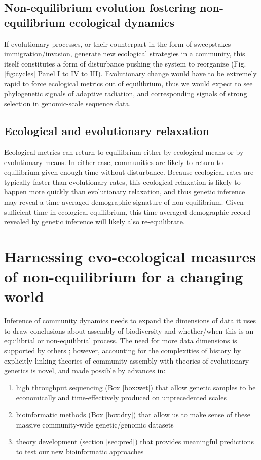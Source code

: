 \documentclass[12pt]{article}
\newcounter{Box}
\begin{document}
\subsection{Non-equilibrium evolution fostering non-equilibrium ecological dynamics}

If evolutionary processes, or their counterpart in the form of
sweepstakes immigration/invasion, generate new ecological strategies
in a community, this itself constitutes a form of disturbance pushing
the system to reorganize (Fig.
\ref{fig:cycles} Panel I to IV to III).  Evolutionary change would
have to be extremely rapid to force ecological metrics out of
equilibrium, thus we would
expect to see phylogenetic signals of adaptive radiation, and
corresponding signals of strong selection in genomic-scale sequence
data.

\subsection{Ecological and evolutionary relaxation}

Ecological metrics can return to equilibrium either by ecological
means or by evolutionary means. In either case, communities are likely
to return to equilibrium given enough time without
disturbance. Because ecological rates are typically faster than
evolutionary rates, this ecological relaxation is likely to happen
more quickly than evolutionary relaxation, and thus genetic inference
may reveal a time-averaged demographic signature of
non-equilibrium. Given sufficient time in ecological equilibrium, this
time averaged demographic record revealed by genetic inference will
likely also re-equilibrate.


\section{Harnessing evo-ecological measures of non-equilibrium for a changing world}

Inference of community dynamics needs to expand the dimensions of data
it uses to draw conclusions about assembly of biodiversity and
whether/when this is an equilibrial or non-equilibrial process. The
need for more data dimensions is supported by others
\citep{mcgill2007}; however, accounting for the complexities of
history by explicitly linking theories of community assembly with
theories of evolutionary genetics is novel, and made possible by
advances in:
\begin{enumerate}
\item high throughput sequencing (Box \ref{box:wet}) that allow
  genetic samples to be economically and time-effectively produced on
  unprecedented scales
\item bioinformatic methods (Box \ref{box:dry}) that allow
  us to make sense of these massive community-wide genetic/genomic
  datasets
\item theory development (section \ref{sec:pred}) that provides
  meaningful predictions to test our new bioinformatic approaches
\end{enumerate}
\end{document}

